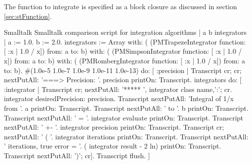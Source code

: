 The function to integrate is specified as a block closure as
discussed in section \ref{sec:stFunction}.
\begin{listing}[label=lst:intcompare]{Smalltalk}
{Smalltalk comparison script for integration algorithms}
| a b  integrators |
a := 1.0.
b := 2.0.
integrators := Array with: (
            (PMTrapezeIntegrator function: [ :x | 1.0 / x]) from: a to: b)
            with: (
            (PMSimpsonIntegrator function: [ :x | 1.0 / x]) from: a to: b)
            with: (
            (PMRombergIntegrator function: [ :x | 1.0 / x]) from: a to: b).
#(1.0e-5 1.0e-7 1.0e-9 1.0e-11 1.0e-13) do: 
[ :precision |
   Transcript cr; cr; nextPutAll: '===> Precision: '.
   precision printOn: Transcript.
   integrators do:
      [ :integrator |
      Transcript cr; nextPutAll: '*****   ', integrator class name,':'; cr.
      integrator desiredPrecision: precision.
      Transcript nextPutAll: 'Integral of 1/x from '.
      a printOn: Transcript.
      Transcript nextPutAll: ' to '.
      b printOn: Transcript.
      Transcript nextPutAll: ' = '.
      integrator evaluate printOn: Transcript.
      Transcript nextPutAll: ' +- '.
      integrator precision printOn: Transcript.
      Transcript cr; nextPutAll: ' ( '.
      integrator iterations printOn: Transcript.
      Transcript nextPutAll: ' iterations, true error = '.
      ( integrator result - 2 ln) printOn: Transcript.
      Transcript nextPutAll: ')'; cr].
   Transcript flush.
]
\end{listing}

